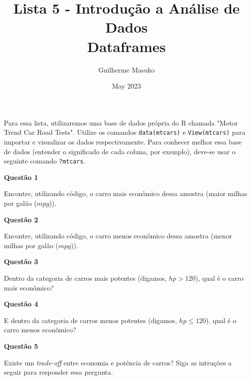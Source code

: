 \documentclass[12pt, a4paper]{article}
\title{Lista 5 - Introdução a Análise de Dados \\
	Dataframes}
\author{Guilherme Masuko}
\date{May 2023}
\begin{document}
	
\clearpage
\maketitle
\thispagestyle{empty}

Para essa lista, utilizaremos uma base de dados própria do R chamada "Motor Trend Car Road Tests". Utilize os comandos \texttt{data(mtcars)} e \texttt{View(mtcars)} para importar e visualizar os dados respectivamente. Para conhecer melhor essa base de dados (entender o significado de cada coluna, por exemplo), deve-se usar o seguinte comando \texttt{?mtcars}.

\textbf{Questão 1}

Encontre, utilizando código, o carro mais econômico dessa amostra (maior milhas por galão ($mpg$)).



\textbf{Questão 2}

Encontre, utilizando código, o carro menos econômico dessa amostra (menor milhas por galão ($mpg$)).



\textbf{Questão 3}

Dentro da categoria de carros mais potentes (digamos, $hp > 120$), qual é o carro mais econômico?



\textbf{Questão 4}

E dentro da categoria de carros menos potentes (digamos, $hp \leq 120$), qual é o carro menos econômico?



\textbf{Questão 5}

Existe um \textit{trade-off} entre economia e potência de carros? Siga as intruções a seguir para responder essa pergunta.
\end{document}
